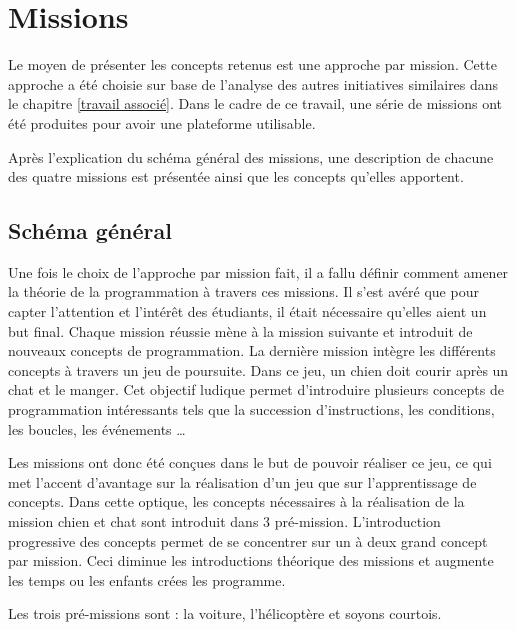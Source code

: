 \section{Missions}
\label{missions}
Le moyen de présenter les concepts retenus est une approche par mission. Cette approche a été choisie sur base de l'analyse des autres initiatives similaires dans le chapitre \ref{travail associé}. Dans le cadre de ce travail, une série de missions ont été produites pour avoir une plateforme utilisable.

Après l'explication du schéma général des missions, une description de chacune des quatre missions est présentée ainsi que les concepts qu'elles apportent.

\subsection{Schéma général}
Une fois le choix de l'approche par mission fait, il a fallu définir comment amener la théorie de la programmation à travers ces missions. Il s'est avéré que pour capter l'attention et l'intérêt des étudiants, il était nécessaire qu'elles aient un but final. Chaque mission réussie mène à la mission suivante et introduit de nouveaux concepts de programmation. La dernière mission intègre les différents concepts à travers un jeu de poursuite. Dans ce jeu, un chien doit courir après un chat et le manger. Cet objectif ludique permet d'introduire plusieurs concepts de programmation intéressants tels que la succession d'instructions, les conditions, les boucles, les événements \ldots

Les missions ont donc été conçues dans le but de pouvoir réaliser ce jeu, ce qui met l'accent d'avantage sur la réalisation d'un jeu que sur l'apprentissage de concepts. Dans cette optique, les concepts nécessaires à la réalisation de la mission chien et chat sont introduit dans 3 pré-mission. L'introduction progressive des concepts permet de se concentrer sur un à deux grand concept par mission. Ceci diminue les introductions théorique des missions et augmente les temps ou les enfants crées les programme.

Les trois pré-missions sont : la voiture, l'hélicoptère et soyons courtois.




